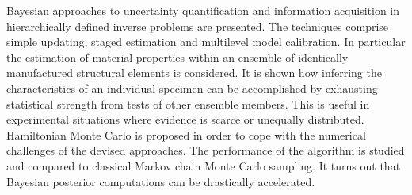Bayesian approaches to uncertainty quantification and information acquisition in hierarchically defined inverse problems are presented.
The techniques comprise simple updating, staged estimation and multilevel model calibration.
In particular the estimation of material properties within an ensemble of identically manufactured structural elements is considered.
It is shown how inferring the characteristics of an individual specimen can be accomplished by exhausting statistical strength from tests of other ensemble members.
This is useful in experimental situations where evidence is scarce or unequally distributed.
Hamiltonian Monte Carlo is proposed in order to cope with the numerical challenges of the devised approaches.
The performance of the algorithm is studied and compared to classical Markov chain Monte Carlo sampling.
It turns out that Bayesian posterior computations can be drastically accelerated.